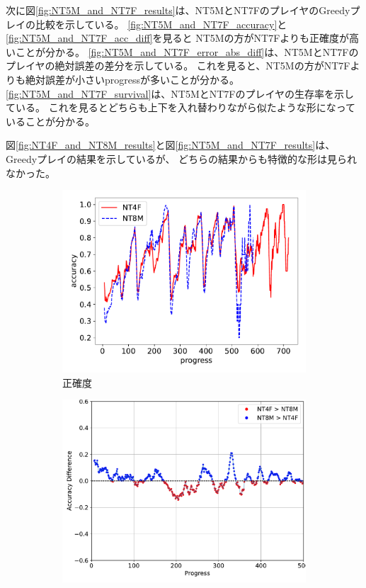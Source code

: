 次に図\ref{fig:NT5M_and_NT7F_results}は、NT5MとNT7FのプレイヤのGreedyプレイの比較を示している。
\ref{fig:NT5M_and_NT7F_accuracy}と\ref{fig:NT5M_and_NT7F_acc_diff}を見ると
NT5Mの方がNT7Fよりも正確度が高いことが分かる。
\ref{fig:NT5M_and_NT7F_error_abs_diff}は、NT5MとNT7Fのプレイヤの絶対誤差の差分を示している。
これを見ると、NT5Mの方がNT7Fよりも絶対誤差が小さいprogressが多いことが分かる。
\ref{fig:NT5M_and_NT7F_survival}は、NT5MとNT7Fのプレイヤの生存率を示している。
これを見るとどちらも上下を入れ替わりながら似たような形になっていることが分かる。

図\ref{fig:NT4F_and_NT8M_results}と図\ref{fig:NT5M_and_NT7F_results}は、Greedyプレイの結果を示しているが、
どちらの結果からも特徴的な形は見られなかった。
    
\begin{figure}[t]
\centering
\begin{subfigure}[b]{0.49\linewidth}
    \includegraphics[width=\linewidth]{pdf/compare/EXP6_NT4F_and_NT8M/accuracy.pdf}
    \caption{正確度}
    \label{fig:EXP6_:NT4F_and_NT8M_accuracy}
\end{subfigure}
\begin{subfigure}[b]{0.49\linewidth}
    \includegraphics[width=\linewidth]{pdf/compare/EXP6_NT4F_and_NT8M/acc_diff_plot.pdf}

\end{subfigure}
\end{figure}
